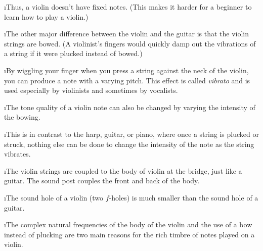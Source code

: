 \i Thus, a violin doesn't have fixed notes.
(This makes it harder for a beginner to learn
how to play a violin.)

\i The other major difference between the violin and 
the guitar is that the violin strings are bowed.
(A violinist's fingers would quickly damp 
out the vibrations of a string if it were plucked 
instead of bowed.)

\i By wiggling your finger when you press a string
against the neck of the violin, 
you can produce a note with a varying pitch.
This effect is called {\em vibrato} and is used 
especially by violinists and sometimes by vocalists.

\i The tone quality of a violin note can also be changed
by varying the intensity of the bowing.
 
\i This is in contrast to the  harp, guitar, or piano, 
where once a string is plucked or struck, nothing else can be
done to change the intensity of the note as the string vibrates.

\i The violin strings are coupled
to the body of violin at the bridge, just like a guitar.
The sound post couples the front and back of the body.

\i The sound hole of a violin (two $f$-holes)
is much smaller than the sound hole of a guitar.

\i The complex natural frequencies of the body of the 
violin and the use of a bow instead of plucking are 
two main reasons for the rich timbre of notes played on
a violin.

\ei
